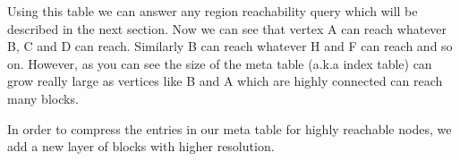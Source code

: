 Using this table we can answer any region reachability query which will be described in the next section. Now we can see that vertex A can reach whatever B, C and D can reach. Similarly B can reach whatever H and F can reach and so on. However, as you can see the size of the meta table (a.k.a index table) can grow really large as vertices like B and A which are highly connected can reach many blocks.

In order to compress the entries in our meta table for highly reachable nodes, we add a new layer of blocks with higher resolution.


